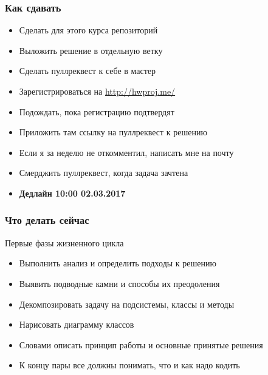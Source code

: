 \documentclass[xetex,mathserif,serif]{beamer}
\begin{document}
	\begin{frame}
		\frametitle{Как сдавать}
		\begin{itemize}
			\item Сделать для этого курса репозиторий
			\item Выложить решение в отдельную ветку
			\item Сделать пуллреквест к себе в мастер
			\item Зарегистрироваться на \url{http://hwproj.me/}
			\item Подождать, пока регистрацию подтвердят
			\item Приложить там ссылку на пуллреквест к решению
			\item Если я за неделю не откомментил, написать мне на почту
			\item Смерджить пуллреквест, когда задача зачтена
			\item \textbf{Дедлайн 10:00 02.03.2017}
		\end{itemize}
	\end{frame}
	
	\begin{frame}
		\frametitle{Что делать сейчас}
		Первые фазы жизненного цикла
		\begin{itemize}
			\item Выполнить анализ и определить подходы к решению
			\item Выявить подводные камни и способы их преодоления
			\item Декомпозировать задачу на подсистемы, классы и методы
			\item Нарисовать диаграмму классов
			\item Словами описать принцип работы и основные принятые решения
			\item К концу пары все должны понимать, что и как надо кодить
		\end{itemize}
	\end{frame}
\end{document}
